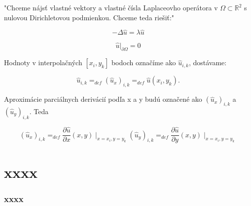 \documentclass{beamer}
\begin{document}
\begin{frame}
"Chceme nájsť vlastné vektory a vlastné čísla Laplaceovho operátora v $\Omega \subset \mathbb{R}^{2}$ s nulovou Dirichletovou podmienkou. Chceme teda riešiť:"

\begin{subeqations}
\label{eq:4}
\begin{equation}
\label{eq:5}
-\Delta{\widehat{u}}=\lambda\widehat{u}
\end{equation}

\begin{equation}
\label{eq:6}
\widehat{u}|_{\partial{\Omega}}=0
\end{equation}

\end{subeqations}




Hodnoty  v interpolačných $[x_{i},y_{k}]$ bodoch označíme ako $\widehat{u}_{i,k}$, dostávame:

\begin{equation}
\label{eq:6}
\widehat{u}_{i,k}=_{def}(\widehat{u}_{x})_{i,k}=_{def}\widehat{u}(x_i,y_k).
\end{equation}

Aproximácie parciálnych derivácií podľa x a y budú označené ako $(\widehat{u}_{x})_{i,k}$ a $(\widehat{u}_{y})_{i,k}$. Teda



\begin{subequations}
\label{eq:7}
\begin{equation}
\label{eq:8}
(\widehat{u}_{x})_{i,k}=_{def}\frac{\partial \widehat{u} }{\partial x}(x,y)\mid_{x=x_i,y=y_k}
\end{equation}
\begin{equation}
\label{eq:9}
(\widehat{u}_{y})_{i,k}=_{def}\frac{\partial \widehat{u} }{\partial y}(x,y)\mid_{x=x_i,y=y_k}
\end{equation}
\end{subequations}



\end{frame}


\section*{xxxx}
\label{sec:xxxx}

\begin{frame}
  \frametitle{xxxx}


\end{frame}
\end{document}
